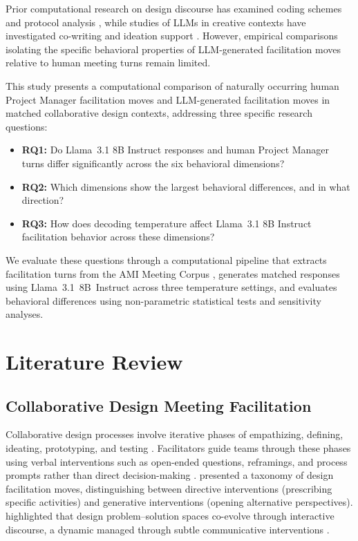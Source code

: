 \documentclass[preprint,12pt,authoryear]{elsarticle}
\begin{document}
Prior computational research on design discourse has examined coding schemes and protocol analysis \citep{kan2017, stempfle2002, chandrasegaran2019}, while studies of LLMs in creative contexts have investigated co-writing \citep{lee2022, yuan2022} and ideation support \citep{peng2025}. However, empirical comparisons isolating the specific behavioral properties of LLM-generated facilitation moves relative to human meeting turns remain limited.

This study presents a computational comparison of naturally occurring human Project Manager facilitation moves and LLM-generated facilitation moves in matched collaborative design contexts, addressing three specific research questions:

\begin{itemize}
    \item \textbf{RQ1:} Do Llama~3.1 8B Instruct responses and human Project Manager turns differ significantly across the six behavioral dimensions?
    \item \textbf{RQ2:} Which dimensions show the largest behavioral differences, and in what direction?
    \item \textbf{RQ3:} How does decoding temperature affect Llama~3.1 8B Instruct facilitation behavior across these dimensions?
\end{itemize}

We evaluate these questions through a computational pipeline that extracts facilitation turns from the AMI Meeting Corpus \citep{carletta2005ami}, generates matched responses using Llama~3.1~8B~Instruct \citep{dubey2024llama3} across three temperature settings, and evaluates behavioral differences using non-parametric statistical tests and sensitivity analyses.

\section{Literature Review}

\subsection{Collaborative Design Meeting Facilitation}

Collaborative design processes involve iterative phases of empathizing, defining, ideating, prototyping, and testing \citep{brown2008}. Facilitators guide teams through these phases using verbal interventions such as open-ended questions, reframings, and process prompts rather than direct decision-making \citep{seidel2013}. \citet{starostka2021} presented a taxonomy of design facilitation moves, distinguishing between directive interventions (prescribing specific activities) and generative interventions (opening alternative perspectives). \citet{dorst2001creativity} highlighted that design problem--solution spaces co-evolve through interactive discourse, a dynamic managed through subtle communicative interventions \citep{schon1983}.
\end{document}
